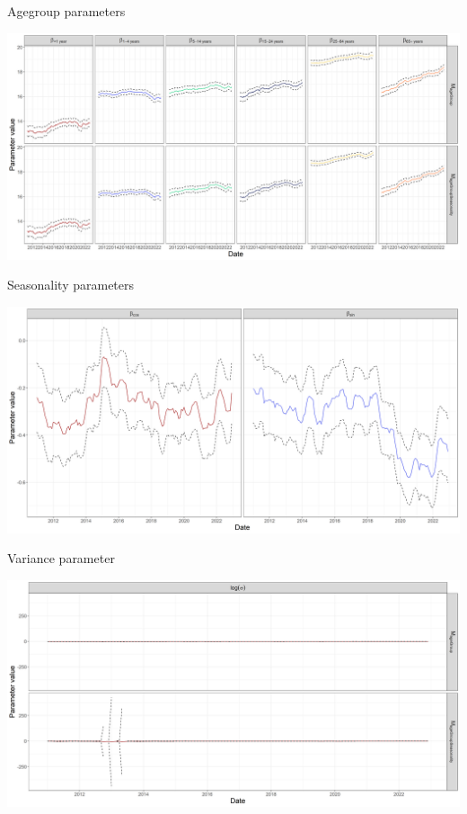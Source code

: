 \documentclass[aspectratio=169]{beamer}
\begin{document}
\begin{frame}{Agegroup parameters}
\protect\hypertarget{agegroup-parameters}{}
\tiny

\includegraphics[width=1\linewidth]{../figures/ageGroupParxSTEC_PoisN}

\normalsize
\end{frame}

\begin{frame}{Seasonality parameters}
\protect\hypertarget{seasonality-parameters}{}
\tiny

\includegraphics[width=1\linewidth]{../figures/SeasonalityParxSTEC_PoisN}

\normalsize
\end{frame}

\begin{frame}{Variance parameter}
\protect\hypertarget{variance-parameter}{}
\tiny

\includegraphics[width=1\linewidth]{../figures/log_sigmaxSTEC_PoisN}

\normalsize
\end{frame}
\end{document}
